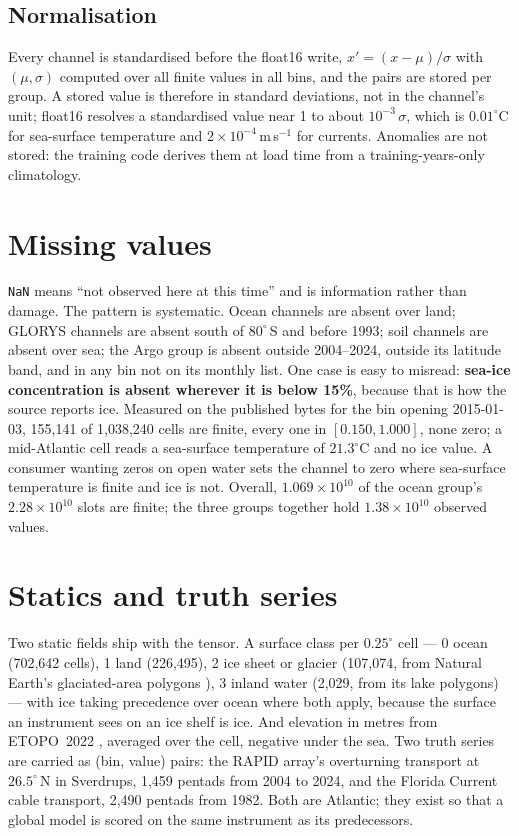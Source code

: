 \documentclass[10pt]{article}
\newcommand{\code}[1]{\texttt{#1}}
\begin{document}
\subsection{Normalisation}

Every channel is standardised before the float16 write, $x' = (x-\mu)/\sigma$
with $(\mu,\sigma)$ computed over all finite values in all bins, and the pairs
are stored per group. A stored value is therefore in standard deviations, not
in the channel's unit; float16 resolves a standardised value near 1 to about
$10^{-3}\,\sigma$, which is $0.01^\circ$C for sea-surface temperature and
$2\times10^{-4}$\,m\,s$^{-1}$ for currents. Anomalies are not stored: the
training code derives them at load time from a training-years-only
climatology.

\section{Missing values}

\code{NaN} means ``not observed here at this time'' and is information
rather than damage. The pattern is systematic. Ocean channels are absent over
land; GLORYS channels are absent south of $80^\circ$\,S and before 1993; soil
channels are absent over sea; the Argo group is absent outside 2004--2024,
outside its latitude band, and in any bin not on its monthly list. One case
is easy to misread: \textbf{sea-ice concentration is absent wherever it is
below 15\%}, because that is how the source reports ice. Measured on the
published bytes for the bin opening 2015-01-03, 155,141 of 1,038,240 cells
are finite, every one in $[0.150, 1.000]$, none zero; a mid-Atlantic cell
reads a sea-surface temperature of $21.3^\circ$C and no ice value. A
consumer wanting zeros on open water sets the channel to zero where
sea-surface temperature is finite and ice is not. Overall, $1.069\times10^{10}$
of the ocean group's $2.28\times10^{10}$ slots are finite; the three groups
together hold $1.38\times10^{10}$ observed values.

\section{Statics and truth series}

Two static fields ship with the tensor. A surface class per $0.25^\circ$
cell --- 0 ocean (702,642 cells), 1 land (226,495), 2 ice sheet or glacier
(107,074, from Natural Earth's glaciated-area polygons \cite{ne}), 3 inland
water (2,029, from its lake polygons) --- with ice taking precedence over
ocean where both apply, because the surface an instrument sees on an ice
shelf is ice. And elevation in metres from ETOPO~2022 \cite{etopo}, averaged
over the cell, negative under the sea. Two truth series are carried as
(bin, value) pairs: the RAPID array's overturning transport at
$26.5^\circ$\,N in Sverdrups, 1,459 pentads from 2004 to 2024, and the Florida
Current cable transport, 2,490 pentads from 1982. Both are Atlantic; they
exist so that a global model is scored on the same instrument as its
predecessors.
\end{document}
